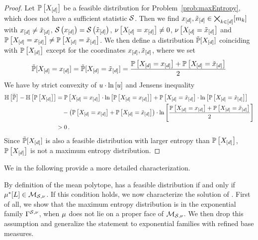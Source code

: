 \begin{proof}
    Let $\mathbb{P}\left[X_{[d]}\right]$ be a feasible distribution for Problem~\eqref{prob:maxEntropy}, which does not have a sufficient statistic $\mathcal{S}$.
    Then we find $x_{[d]},\tilde{x}_{[d]}\in\bigtimes_{k\in[d]}[m_{k}]$ with $x_{[d]}\neq\tilde{x}_{[d]}$, $\mathcal{S}\left(x_{[d]}\right)=\mathcal{S}\left(\tilde{x}_{[d]}\right)$, $\nu\left[X_{[d]}=x_{[d]}\right]\neq0$, $\nu\left[X_{[d]}=\tilde{x}_{[d]}\right]$ and $\mathbb{P}\left[X_{[d]}=x_{[d]}\right]\neq\mathbb{P}\left[X_{[d]}=\tilde{x}_{[d]}\right]$.
    We then define a distribution $\tilde{\mathbb{P}}[X_{[d]}]$ coinciding with $\mathbb{P}\left[X_{[d]}\right]$ except for the coordinates $x_{[d]},\tilde{x}_{[d]}$, where we set
    \begin{align*}
        \tilde{\mathbb{P}}[X_{[d]}=x_{[d]}] = \tilde{\mathbb{P}}[X_{[d]}=\tilde{x}_{[d]}] = \frac{\mathbb{P}\left[X_{[d]}=x_{[d]}\right]+\mathbb{P}\left[X_{[d]}=\tilde{x}_{[d]}\right]}{2}
    \end{align*}
    We have by strict convexity of $u\cdot\ln \left[ u \right]$ and Jensens inequality
    \begin{align*}
        \mathbb{H}\left[\tilde{\mathbb{P}}\right] -  \mathbb{H}\left[\mathbb{P}\left[X_{[d]}\right]\right]
        &= \mathbb{P}\left[X_{[d]}=x_{[d]}\right] \cdot \ln \left[ \mathbb{P}\left[X_{[d]}=x_{[d]}\right] \right]
        + \mathbb{P}\left[X_{[d]}=\tilde{x}_{[d]}\right] \cdot \ln \left[ \mathbb{P}\left[X_{[d]}=\tilde{x}_{[d]}\right] \right] \\
        & \quad  - \left(\mathbb{P}\left[X_{[d]}=x_{[d]}\right]+\mathbb{P}\left[X_{[d]}=\tilde{x}_{[d]}\right]\right) \cdot \ln \left[ \frac{\mathbb{P}\left[X_{[d]}=x_{[d]}\right]+\mathbb{P}\left[X_{[d]}=\tilde{x}_{[d]}\right]}{2} \right] \\
        & > 0 \, .
    \end{align*}
    Since $\tilde{\mathbb{P}}[X_{[d]}]$ is also a feasible distribution with larger entropy than $\mathbb{P}\left[X_{[d]}\right]$, $\mathbb{P}\left[X_{[d]}\right]$ is not a maximum entropy distribution.
\end{proof}

We in the following provide a more detailed characterization.


By definition of the mean polytope,  has a feasible distribution if and only if $\mu^*[L]\in\mathcal{M}_{\mathcal{S},\nu}$.
If this condition holds, we now characterize the solution of .
First of all, we show that the maximum entropy distribution is in the exponential family $\Gamma^{\mathcal{S},\nu}$, when $\mu$ does not lie on a proper face of $\mathcal{M}_{\mathcal{S},\nu}$.
We then drop this assumption and generalize the statement to exponential families with refined base measures.

